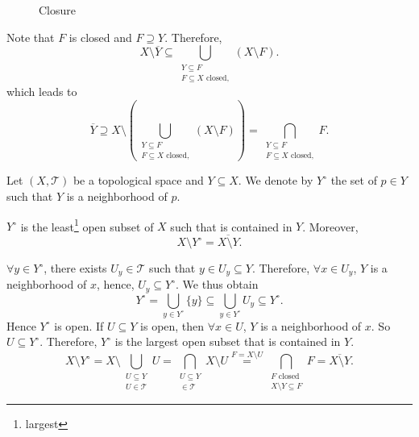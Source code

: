 \begin{proofenv}
\begin{figure}[H]
\begin{center}
\end{center}
\caption{Closure}
\end{figure}
    Note that $F$ is closed and $F\supseteq Y$. Therefore, 
    $$X\setminus \overline{Y}\subseteq \bigcup_{\substack{Y\subseteq F\\F\subseteq X \text{ closed,}}} (X\setminus F).$$
    which leads to 
    $$\overline{Y}\supseteq X\setminus \left(\bigcup_{\substack{Y\subseteq F\\F\subseteq X \text{ closed,}}} (X\setminus F)\right)=\bigcap_{\substack{Y\subseteq F\\F\subseteq X \text{ closed,}}} F.$$


    


\end{proofenv}
\begin{definitionenv}
    Let $(X,\mathscr{T})$ be a topological space and $Y\subseteq X$. We denote by $Y^\circ$ the set of $p\in Y$ such that $Y$ is a neighborhood of $p$.
\end{definitionenv}
\begin{propositionenv}
    $Y^\circ$ is the least\footnote{largest} open subset of $X$ such that is contained in $Y$. Moreover,
    $$X\setminus Y^\circ=\overline{X\setminus Y}.$$
\end{propositionenv}
\begin{proofenv}
    $\forall y\in Y^\circ$, there exists $U_y\in\mathscr{T}$ such that $y\in U_y\subseteq Y$. Therefore, $\forall x\in U_y$, $Y$ is a neighborhood of $x$, hence, $U_y\subseteq Y^\circ$. We thus obtain 
    $$Y^\circ=\bigcup_{y\in Y^\circ}\{y\}\subseteq\bigcup_{y\in Y^\circ}U_y\subseteq Y^\circ.$$ 
    Hence $Y^\circ$ is open. 
    \newline
    If $U\subseteq Y$ is open, then $\forall x\in U$, $Y$ is a neighborhood of $x$. So $U\subseteq Y^\circ$. Therefore, $Y^\circ$ is the largest open subset that is contained in $Y$.
    $$X\setminus Y^\circ=X\setminus\bigcup_{\substack{U\subseteq Y\\U\in \mathscr{T}}}U=\bigcap_{\substack{U\subseteq Y\\\in \mathscr{T}}}X\setminus U\overset{F=X\setminus U}{=}\bigcap_{\substack{ F\text{ closed}\\X\setminus Y\subseteq F}}F=\overline{X\setminus Y}.$$
\end{proofenv}

